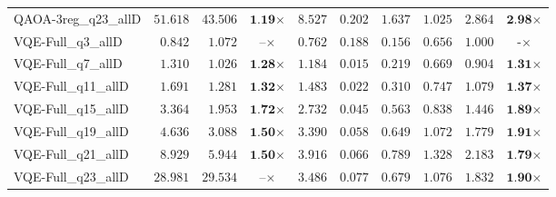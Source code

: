 \begin{table*}[t]
{\begin{tabular}{| l || r r c || r r r r r c |}
QAOA-3reg\_q23\_allD & $51.618$ & $43.506$ & $\textbf{1.19}$$\times$ & $8.527$ & $0.202$ & $1.637$ & $1.025$ & $2.864$ & $\textbf{2.98}$$\times$ \\
VQE-Full\_q3\_allD & $0.842$ & $1.072$ & $\textbf{--}$$\times$ & $0.762$ & $0.188$ & $0.156$ & $0.656$ & $1.000$ & $\textbf{-}$$\times$ \\
VQE-Full\_q7\_allD & $1.310$ & $1.026$ & $\textbf{1.28}$$\times$ & $1.184$ & $0.015$ & $0.219$ & $0.669$ & $0.904$ & $\textbf{1.31}$$\times$ \\
VQE-Full\_q11\_allD & $1.691$ & $1.281$ & $\textbf{1.32}$$\times$ & $1.483$ & $0.022$ & $0.310$ & $0.747$ & $1.079$ & $\textbf{1.37}$$\times$ \\
VQE-Full\_q15\_allD & $3.364$ & $1.953$ & $\textbf{1.72}$$\times$ & $2.732$ & $0.045$ & $0.563$ & $0.838$ & $1.446$ & $\textbf{1.89}$$\times$ \\
VQE-Full\_q19\_allD & $4.636$ & $3.088$ & $\textbf{1.50}$$\times$ & $3.390$ & $0.058$ & $0.649$ & $1.072$ & $1.779$ & $\textbf{1.91}$$\times$ \\
VQE-Full\_q21\_allD & $8.929$ & $5.944$ & $\textbf{1.50}$$\times$ & $3.916$ & $0.066$ & $0.789$ & $1.328$ & $2.183$ & $\textbf{1.79}$$\times$ \\
VQE-Full\_q23\_allD & $28.981$ & $29.534$ & $\textbf{--}$$\times$ & $3.486$ & $0.077$ & $0.679$ & $1.076$ & $1.832$ & $\textbf{1.90}$$\times$ \\
\hline
\end{tabular}
}
\end{table*}
